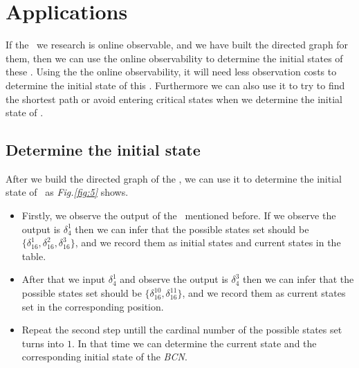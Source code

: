 \section{Applications}
\label{sec:app}
If the \BCNs\ we research is online observable, and we have built the directed graph for them, then we can use the online observability to determine the initial states of these \BCNs. Using the the online observability, it will need less observation costs to determine the initial state of this \BCN. Furthermore we can also use it to try to find the shortest path or avoid entering critical states when we determine the initial state of \BCNs. %

\subsection{Determine the initial state}

After we build the directed graph of the \BCN, we can use it to determine the initial state of \BCNs\ as {\em Fig.\ref{fig:5}} shows. 
\begin{itemize}
  \item Firstly, we observe the output of the \BCN\ mentioned before. If we observe the output is $\delta_4^1$ then we can infer that the possible states set should be $\{\delta_{16}^1,\delta_{16}^2,\delta_{16}^3\}$, and we record them as initial states and current states in the table. 
  \item After that we input  $\delta_4^1$ and observe the output is $\delta_4^3$ then we can infer that the possible states set should be $\{\delta_{16}^{10},\delta_{16}^{11}\}$, and we record them as current states set in the corresponding position. 
 \item Repeat the second step untill the cardinal number of the possible states set turns into $1$. In that time we can determine the current state and the corresponding initial state of the {\em BCN}.
\end{itemize} 

